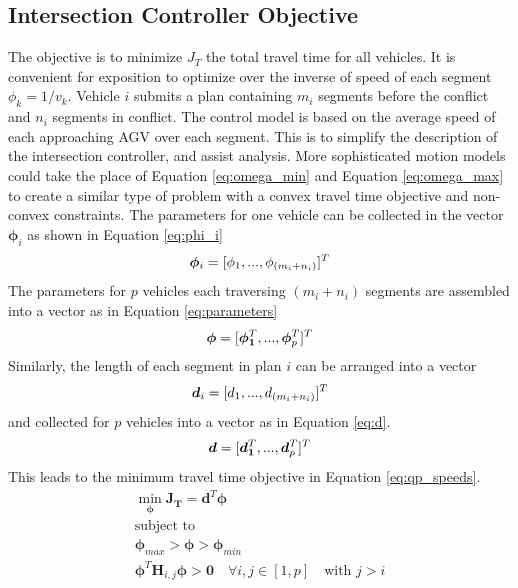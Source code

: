 \documentclass[]{article}
\begin{document}
\subsection{Intersection Controller Objective}
The objective is to minimize $J_T$ the total travel time for all vehicles. It is convenient for exposition to optimize over the inverse of speed of each segment $\phi_k = 1/v_k$. Vehicle $i$ submits a plan containing $m_i$ segments before the conflict and $n_i$ segments in conflict. The control model is based on the average speed of each approaching AGV over each segment. This is to simplify the description of the intersection controller, and assist analysis. More sophisticated motion models could take the place of  Equation \ref{eq:omega_min} and  Equation \ref{eq:omega_max} to create a similar type of problem with a convex travel time objective and non-convex constraints.   
The parameters for one vehicle can be collected in the vector $\bm{\phi}_i$ as shown in Equation \ref{eq:phi_i}
\begin{equation}
	\bm{\phi}_i =  [\phi_{1}, ..., \phi_{(m_i + n_i)}]^T \\
	\label{eq:phi_i}
\end{equation}
The parameters for $p$ vehicles each traversing $(m_i + n_i)$ segments are assembled into a vector as in Equation \ref{eq:parameters}
\begin{equation}
	\bm{\phi} = [\bm{\phi_{1}}^T, ..., \bm{\phi}_{p}^T]^T \\
	\label{eq:parameters}
\end{equation}
Similarly, the length of each segment in plan $i$ can be arranged into a vector 
\begin{equation}
	\bm{d}_i = [d_{1}, ..., d_{(m_i + n_i)}]^T \\
	\label{eq:d_i}
\end{equation}
and collected  for $p$ vehicles into a vector as in Equation \ref{eq:d}.
\begin{equation}
	\bm{d} = [\bm{d_{1}}^T, ..., \bm{d}_{p}^T]^T \\
	\label{eq:d}
\end{equation}
This leads to the minimum travel time objective in Equation \ref{eq:qp_speeds}. 
\begin{equation}
	\begin{array}{c}
		\min \limits_{\bm{\phi}} \bm{J_T} = \bm{d}^T \bm{\phi} \\
		\textrm{subject to}\\
		\bm{\phi}_{max} > \bm{\phi} > \bm{\phi}_{min} \\
		\bm{\phi}^T\bm{H}_{i,j}\bm{\phi} > \bm{0} \quad \forall i,j \in [1,p] \quad \textrm{with } j>i \\
	\end{array}
	\label{eq:qp_speeds}
\end{equation}
\end{document}
